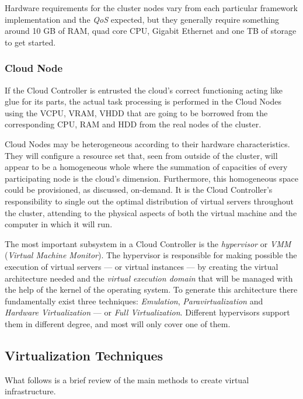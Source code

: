 Hardware requirements for the cluster nodes vary from each particular framework implementation and the \emph{QoS} expected, but they generally require something around 10 GB of RAM, quad core CPU, Gigabit Ethernet and one TB of storage to get started.


\subsubsection{Cloud Node}\label{subsubsec:cloudnode}
\noindent If the Cloud Controller is entrusted the cloud's correct functioning acting like glue for its parts, the actual task processing is performed in the Cloud Nodes using the VCPU, VRAM, VHDD that are going to be borrowed from the corresponding CPU, RAM and HDD from the real nodes of the cluster.

Cloud Nodes may be heterogeneous according to their hardware characteristics. They will configure a resource set that, seen from outside of the cluster, will appear to be a homogeneous whole where the summation of capacities of every participating node is the cloud's dimension. Furthermore, this homogeneous space could be provisioned, as discussed, on-demand. It is the Cloud Controller's responsibility to single out the optimal distribution of virtual servers throughout the cluster, attending to the physical aspects of both the virtual machine and the computer in which it will run.

The most important subsystem in a Cloud Controller is the \emph{hypervisor} or \emph{VMM} (\emph{Virtual Machine Monitor}). The hypervisor is responsible for making possible the execution of virtual servers --- or virtual instances --- by creating the virtual architecture needed and the \emph{virtual execution domain} that will be managed with the help of the kernel of the operating system. To generate this architecture there fundamentally exist three techniques: \emph{Emulation}, \emph{Paravirtualization} and \emph{Hardware Virtualization} --- or \emph{Full Virtualization}. Different hypervisors support them in different degree, and most will only cover one of them.

\subsection{Virtualization Techniques}\label{subsec:tecnicasemu}
\noindent What follows is a brief review of the main methods to create virtual infrastructure.

